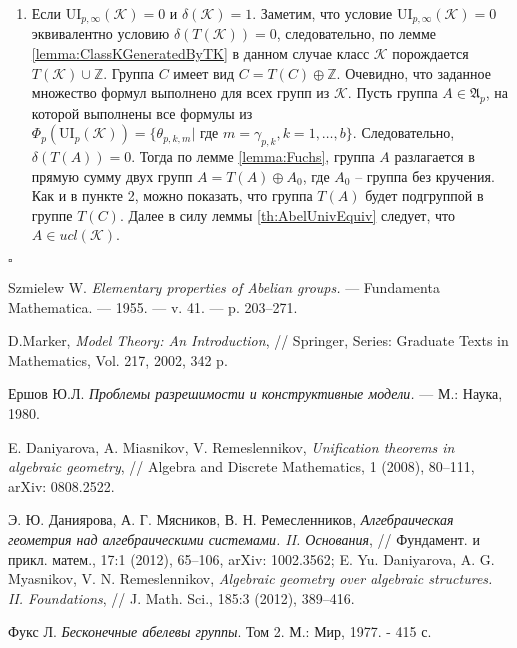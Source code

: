 \documentclass[a4paper,11pt,twoside]{article}
\newcommand{\todoi}[1]{\todo[inline]{#1}}
\def\A{{\mathfrak{A}}}
\def\K{{\mathcal{K}}}
\def\Z{{\mathbb{Z}}}
\def\ui{{\mathrm{UI}}}
\begin{document}
\begin{enumerate}
\item Если $\ui_{p, \infty}(\K) = 0$ и $\delta(\K) = 1$. Заметим, что условие $\ui_{p, \infty}(\K) = 0$ эквивалентно условию $\delta(T(\K)) = 0$, следовательно, по лемме \ref{lemma:ClassKGeneratedByTK} в данном случае класс $\K$ порождается $T(\K) \cup \Z$. Группа $C$ имеет вид $C = T(C) \oplus \Z$. Очевидно, что заданное множество формул выполнено для всех групп из $\K$. Пусть группа $A \in \A_p$, на которой выполнены все формулы из $\Phi_p(\ui_p(\K)) = \{\theta_{p,k,m} | \text{ где } m = \gamma_{p,k}, k = 1, \ldots, b\}.$ Следовательно, $\delta(T(A)) = 0$. Тогда по лемме \ref{lemma:Fuchs}, группа $A$ разлагается в прямую сумму двух групп $A = T(A) \oplus A_0$, где $A_0$ -- группа без кручения. Как и в пункте 2, можно показать, что группа $T(A)$ будет подгруппой в группе $T(C)$. Далее в силу леммы \ref{th:AbelUnivEquiv} следует, что $A \in ucl(\K)$.
\end{enumerate}

$\square$





\begin{thebibliography}{}

 Szmielew W. \textit{Elementary properties of Abelian groups.} — Fundamenta Mathematica. —
1955. — v. 41. — p. 203–271.

 D.Marker, \textit{Model Theory: An Introduction}, // Springer, Series: Graduate Texts in Mathematics, Vol. 217, 2002, 342 p.

 Ершов Ю.Л. \textit{Проблемы разрешимости и конструктивные модели.} --- М.: Наука, 1980.

 E. Daniyarova, A. Miasnikov, V. Remeslennikov, \textit{Unification theorems in algebraic geometry}, // Algebra and Discrete Mathematics, 1 (2008), 80--111, arXiv: 0808.2522.


 \todoi{Проверить ссылку} Э. Ю. Даниярова, А. Г. Мясников, В. Н. Ремесленников, \textit{Алгебраическая геометрия над алгебраическими системами. II. Основания}, // Фундамент. и прикл. матем., 17:1 (2012), 65--106, arXiv: 1002.3562; E. Yu. Daniyarova, A. G. Myasnikov, V. N. Remeslennikov, \textit{Algebraic geometry over algebraic structures. II. Foundations}, // J. Math. Sci., 185:3 (2012), 389--416.

 Фукс Л. \textit{Бесконечные абелевы группы}. Том 2. М.: Мир, 1977. - 415 с.

\end{thebibliography}
\end{document}
